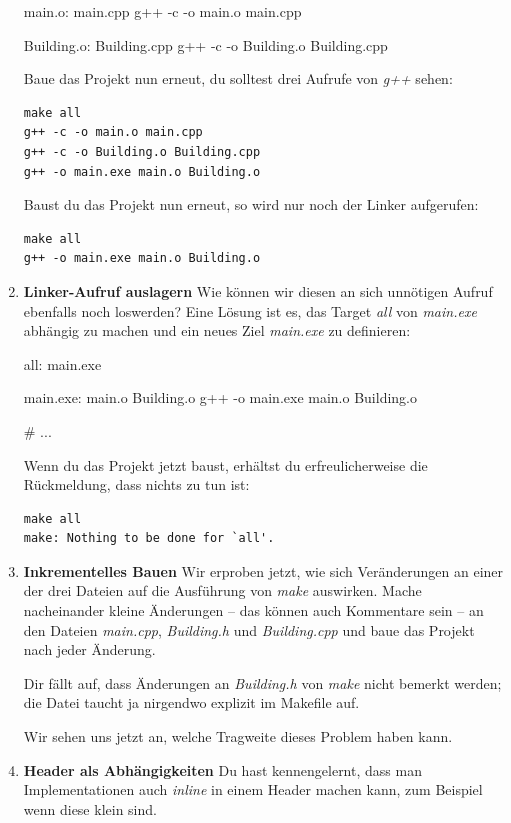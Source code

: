 \begin{enumerate}
\begin{lstmake}
main.o: main.cpp
	g++ -c -o main.o main.cpp

Building.o: Building.cpp
	g++ -c -o Building.o Building.cpp
\end{lstmake}

Baue das Projekt nun erneut, du solltest drei Aufrufe von \emph{g++} sehen:
\begin{verbatim}
make all
g++ -c -o main.o main.cpp
g++ -c -o Building.o Building.cpp
g++ -o main.exe main.o Building.o
\end{verbatim}
Baust du das Projekt nun erneut, so wird nur noch der Linker aufgerufen:
\begin{verbatim}
make all
g++ -o main.exe main.o Building.o
\end{verbatim}

\item\textbf{Linker-Aufruf auslagern}
Wie können wir diesen an sich unnötigen Aufruf ebenfalls noch loswerden?
Eine Lösung ist es, das Target \emph{all} von \emph{main.exe} abhängig zu machen und ein neues Ziel \emph{main.exe} zu definieren:
\begin{lstmake}
all: main.exe

main.exe: main.o Building.o
	g++ -o main.exe main.o Building.o

# ...
\end{lstmake}

Wenn du das Projekt jetzt baust, erhältst du erfreulicherweise die Rückmeldung, dass nichts zu tun ist:
\begin{verbatim}
make all
make: Nothing to be done for `all'.
\end{verbatim}

\item\textbf{Inkrementelles Bauen}
Wir erproben jetzt, wie sich Veränderungen an einer der drei Dateien auf die Ausführung von \emph{make} auswirken.
Mache nacheinander kleine Änderungen -- das können auch Kommentare sein -- an den Dateien \emph{main.cpp}, \emph{Building.h} und \emph{Building.cpp} und baue das Projekt nach jeder Änderung.

Dir fällt auf, dass Änderungen an \emph{Building.h} von \emph{make} nicht bemerkt werden; die Datei taucht ja nirgendwo explizit im Makefile auf.

Wir sehen uns jetzt an, welche Tragweite dieses Problem haben kann.


\item\textbf{Header als Abhängigkeiten}
Du hast kennengelernt, dass man Implementationen auch \emph{inline} in einem Header machen kann, zum Beispiel wenn diese klein sind.


\end{enumerate}
